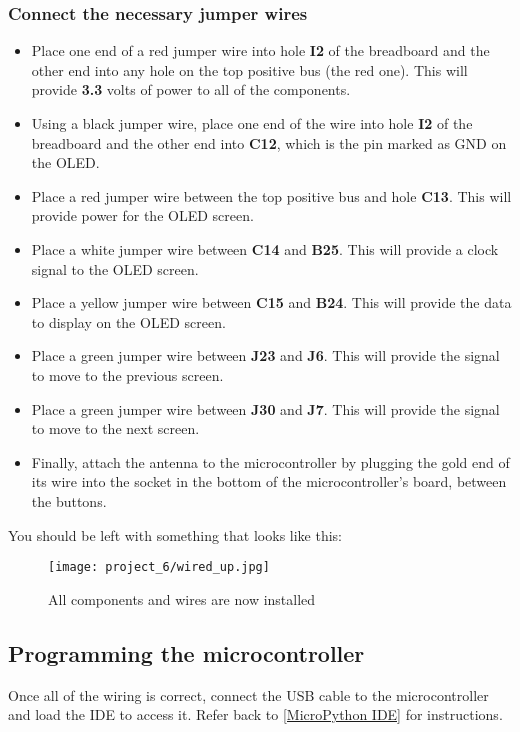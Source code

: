\subsubsection{Connect the necessary jumper wires}
\begin{itemize}
    \item Place one end of a red jumper wire into hole \textbf{I2} of the breadboard and the other end into
    any hole on the top positive bus (the red one). This will provide \textbf{3.3} volts of power to all of the components.
    \item Using a black jumper wire, place one end of the wire into hole \textbf{I2} of the breadboard and the other
    end into \textbf{C12}, which is the pin marked as GND on the OLED.
    \item Place a red jumper wire between the top positive bus and hole \textbf{C13}. This will provide power for the OLED screen.
    \item Place a white jumper wire between \textbf{C14} and \textbf{B25}. This will provide a clock signal to the OLED screen.
    \item Place a yellow jumper wire between \textbf{C15} and \textbf{B24}. This will provide the data to display on the OLED screen.
    \item Place a green jumper wire between \textbf{J23} and \textbf{J6}. This will provide the signal to move to the previous screen.
    \item Place a green jumper wire between \textbf{J30} and \textbf{J7}. This will provide the signal to move to the next screen.
    \item Finally, attach the antenna to the microcontroller by plugging the gold end of its wire into the socket in the bottom of
    the microcontroller's board, between the buttons.
\end{itemize}

You should be left with something that looks like this:
\begin{figure}[H]
    \centering
    \texttt{[image: project\_6/wired\_up.jpg]}
    \caption{All components and wires are now installed}
\end{figure}

\subsection{Programming the microcontroller}
Once all of the wiring is correct, connect the USB cable to the microcontroller and load the IDE to
access it. Refer back to \ref{MicroPython IDE} for instructions.

